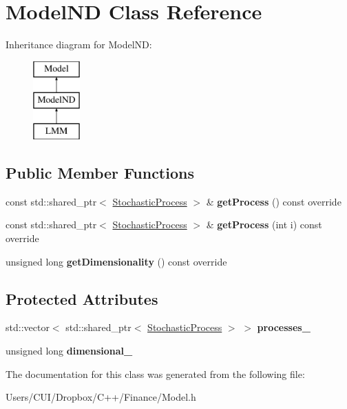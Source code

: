 \hypertarget{class_model_n_d}{}\section{Model\+ND Class Reference}
\label{class_model_n_d}
Inheritance diagram for Model\+ND\+:\begin{figure}[H]
\begin{center}
\leavevmode
\includegraphics[height=3.000000cm]{class_model_n_d}
\end{center}
\end{figure}
\subsection*{Public Member Functions}
\begin{DoxyCompactItemize}
\item 
\hypertarget{class_model_n_d_a98976fe73a8895ff98ba60ea174232f8}{}\label{class_model_n_d_a98976fe73a8895ff98ba60ea174232f8} 
const std\+::shared\+\_\+ptr$<$ \hyperlink{class_stochastic_process}{Stochastic\+Process} $>$ \& {\bfseries get\+Process} () const override
\item 
\hypertarget{class_model_n_d_a62866814432b7c0a0d8f58223cc6279d}{}\label{class_model_n_d_a62866814432b7c0a0d8f58223cc6279d} 
const std\+::shared\+\_\+ptr$<$ \hyperlink{class_stochastic_process}{Stochastic\+Process} $>$ \& {\bfseries get\+Process} (int i) const override
\item 
\hypertarget{class_model_n_d_ab2356536a38f4961257654de629d6093}{}\label{class_model_n_d_ab2356536a38f4961257654de629d6093} 
unsigned long {\bfseries get\+Dimensionality} () const override
\end{DoxyCompactItemize}
\subsection*{Protected Attributes}
\begin{DoxyCompactItemize}
\item 
\hypertarget{class_model_n_d_a9cb778073c54caae0ffea17a59a9a2f9}{}\label{class_model_n_d_a9cb778073c54caae0ffea17a59a9a2f9} 
std\+::vector$<$ std\+::shared\+\_\+ptr$<$ \hyperlink{class_stochastic_process}{Stochastic\+Process} $>$ $>$ {\bfseries processes\+\_\+}
\item 
\hypertarget{class_model_n_d_ae99532975fab32ab6549c0104415b0e7}{}\label{class_model_n_d_ae99532975fab32ab6549c0104415b0e7} 
unsigned long {\bfseries dimensional\+\_\+}
\end{DoxyCompactItemize}


The documentation for this class was generated from the following file\+:\begin{DoxyCompactItemize}
\item 
Users/\+C\+U\+I/\+Dropbox/\+C++/\+Finance/Model.\+h\end{DoxyCompactItemize}
